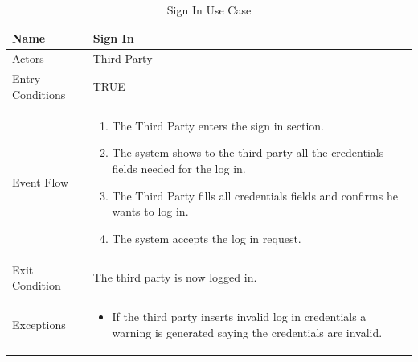 \begin{enumerate}
\FloatBarrier
\begin{table}[h]
\begin{tabular}{|p{3.4cm}|p{}|}
\hline
Name             & Sign In \\ \hline
Actors           & Third Party  \\ \hline
Entry Conditions & TRUE   \\ \hline
Event Flow       & \begin{enumerate}
            \item The Third Party enters the sign in section.
            \item The system shows to the third party all the credentials fields needed for the log in.
            \item The Third Party fills all credentials fields and confirms he wants to log in.
            \item The system accepts the log in request.
        \end{enumerate}\\ \hline
Exit Condition   & The third party is now logged in.\\ \hline
Exceptions       & \begin{itemize}
\item If the third party inserts invalid log in credentials a warning is generated saying the credentials are invalid.
\end{itemize}\\ \hline
\end{tabular}
\caption{Sign In Use Case}
\end{table}
\FloatBarrier


\end{enumerate}
